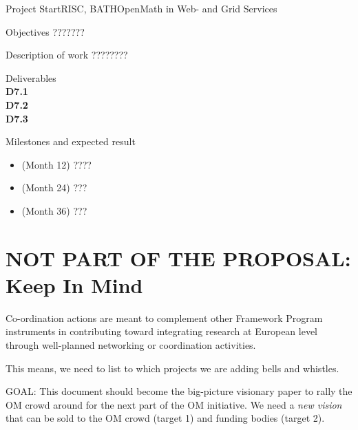 \documentclass{euproposal}
\begin{document}
\begin{workpackage}{36}{7}{Project Start}{RISC, BATH}{OpenMath in Web- and Grid Services}
\begin{wpbox}{Objectives}
???????
\end{wpbox}
\begin{wpbox}{Description of work}
  ????????
\end{wpbox}
\begin{wpbox}{Deliverables\\}
{\bf D7.1} \\
{\bf D7.2} \\
{\bf D7.3} 
\end{wpbox}
\begin{wpbox}{Milestones and expected result}
\begin{itemize}
\item (Month 12) ????
\item (Month 24) ???
\item (Month 36) ???
\end{itemize}
\end{wpbox}
\end{workpackage}

\newpage

\section{NOT PART OF THE PROPOSAL:  Keep In Mind}
Co-ordination actions are meant to complement other Framework Program
instruments in contributing toward integrating research at European
level through well-planned networking or coordination activities.

This means, we need to list to which projects we are adding bells and
whistles.

GOAL: This document should become the big-picture visionary paper to
rally the OM crowd around for the next part of the OM initiative.  We
need a \emph{new vision} that can be sold to the OM crowd (target 1)
and funding bodies (target 2).
\end{document}
